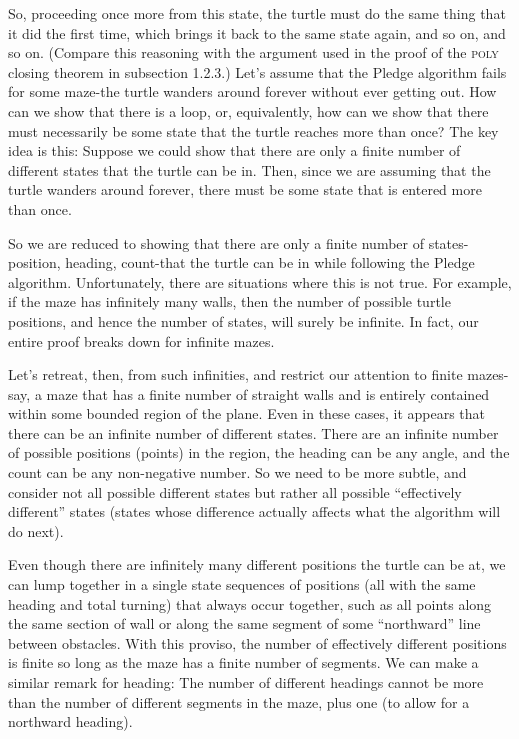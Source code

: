 \documentclass{book}
\begin{document}
So, proceeding once more from this state, the turtle must do the same
thing that it did the first time, which brings it back to the same state
again, and so on, and so on. (Compare this reasoning with the argument
used in the proof of the \textsc{poly} closing theorem in subsection 1.2.3.)
Let's assume that the Pledge algorithm fails for some maze-the turtle
wanders around forever without ever getting out. How can we show
that there is a loop, or, equivalently, how can we show that there must
necessarily be some state that the turtle reaches more than once? The
key idea is this: Suppose we could show that there are only a finite
number of different states that the turtle can be in. Then, since we are
assuming that the turtle wanders around forever, there must be some
state that is entered more than once.

So we are reduced to showing that there are only a finite number
of states-position, heading, count-that the turtle can be in while
following the Pledge algorithm. Unfortunately, there are situations
where this is not true. For example, if the maze has infinitely many
walls, then the number of possible turtle positions, and hence the number
of states, will surely be infinite. In fact, our entire proof breaks down
for infinite mazes.

Let's retreat, then, from such infinities, and restrict our attention to
finite mazes-say, a maze that has a finite number of straight walls and
is entirely contained within some bounded region of the plane. Even in
these cases, it appears that there can be an infinite number of different
states. There are an infinite number of possible positions (points) in
the region, the heading can be any angle, and the count can be any
non-negative number. So we need to be more subtle, and consider not
all possible different states but rather all possible ``effectively different''
states (states whose difference actually affects what the algorithm will
do next).

Even though there are infinitely many different positions the turtle can
be at, we can lump together in a single state sequences of positions (all
with the same heading and total turning) that always occur together,
such as all points along the same section of wall or along the same
segment of some ``northward'' line between obstacles. With this proviso,
the number of effectively different positions is finite so long as the maze
has a finite number of segments. We can make a similar remark for
heading: The number of different headings cannot be more than the
number of different segments in the maze, plus one (to allow for a
northward heading).
\end{document}
